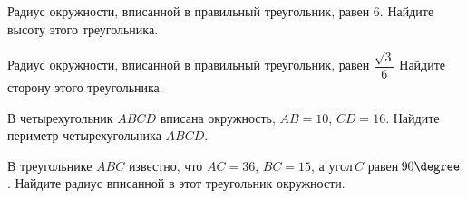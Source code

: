 \begin{class}[number=4]
\begin{listofex}
		\item Радиус окружности, вписанной в правильный треугольник, равен \( 6 \). Найдите высоту этого треугольника.
		\item Радиус окружности, вписанной в правильный треугольник, равен \( \dfrac{\sqrt{3}}{6} \) Найдите сторону этого треугольника.
		\item В четырехугольник \( ABCD \) вписана окружность, \( AB=10 \), \( CD=16 \). Найдите периметр четырехугольника \( ABCD \).
		\item В треугольнике \( ABC \) известно, что \( AC=36 \), \( BC=15 \), а угол \( C \) равен \( 90\degree \). Найдите радиус вписанной в этот треугольник окружности.
	\end{listofex}
\end{class}
